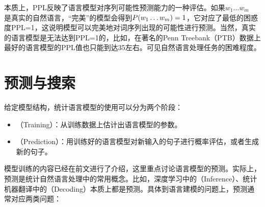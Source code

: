 \parinterval  本质上，PPL反映了语言模型对序列可能性预测能力的一种评估。如果$ w_1\dots w_m $\\是真实的自然语言，“完美”的模型会得到$ {P}(w_1\dots w_m)=1 $，它对应了最低的困惑度PPL=1，这说明模型可以完美地对词序列出现的可能性进行预测。当然，真实的语言模型是无法达到PPL=1的，比如，在著名的Penn Treebank（PTB）数据上最好的语言模型的PPL值也只能到达35左右。可见自然语言处理任务的困难程度。


\sectionnewpage
\section{预测与搜索}

\parinterval 给定模型结构，统计语言模型的使用可以分为两个阶段：

\begin{itemize}
\vspace{0.5em}
\item {\small{}}（Training）：从训练数据上估计出语言模型的参数。
\vspace{0.5em}
\item {\small{}}（Prediction）：用训练好的语言模型对新输入的句子进行概率评估，或者生成新的句子。
\vspace{0.5em}
\end{itemize}

\parinterval 模型训练的内容已经在前文进行了介绍，这里重点讨论语言模型的预测。实际上，预测是统计自然语言处理中的常用概念。比如，深度学习中的{\small{}}（Inference）、统计机器翻译中的{\small{}}（Decoding）本质上都是预测。具体到语言建模的问题上，预测通常对应两类问题：

